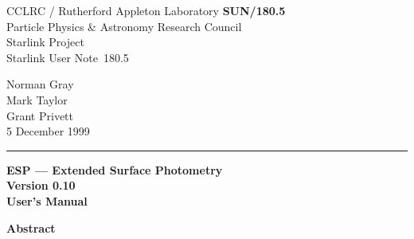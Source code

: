 \documentclass[twoside,11pt]{article}
\newcommand{\stardoccategory}  {Starlink User Note}
\newcommand{\stardocinitials}  {SUN}
\newcommand{\stardocnumber}    {180.5}
\newcommand{\stardocauthors}   {Norman Gray\\Mark Taylor\\Grant Privett}
\newcommand{\stardocdate}      {5 December 1999}
\newcommand{\stardoctitle}     {ESP --- Extended Surface Photometry}
\newcommand{\stardocversion}   {Version 0.10}
\newcommand{\stardocmanual}    {User's Manual}
\newcommand{\stardocname}{\stardocinitials /\stardocnumber}
\newenvironment{latexonly}{}{}
\begin{document}
\thispagestyle{empty}

\begin{latexonly}
   CCLRC / {\sc Rutherford Appleton Laboratory} \hfill {\bf \stardocname}\\
   {\large Particle Physics \& Astronomy Research Council}\\
   {\large Starlink Project\\}
   {\large \stardoccategory\ \stardocnumber}
   \begin{flushright}
   \stardocauthors\\
   \stardocdate
   \end{flushright}
   \vspace{-4mm}
   \rule{\textwidth}{0.5mm}
   \vspace{5mm}
   \begin{center}
   {\Huge\bf  \stardoctitle \\ [2.5ex]}
   {\LARGE\bf \stardocversion \\ [4ex]}
   {\Huge\bf  \stardocmanual}
   \end{center}
   \vspace{5mm}

   \vspace{10mm}
   \begin{center}
      {\Large\bf Abstract}
   \end{center}
\end{latexonly}
\end{document}
